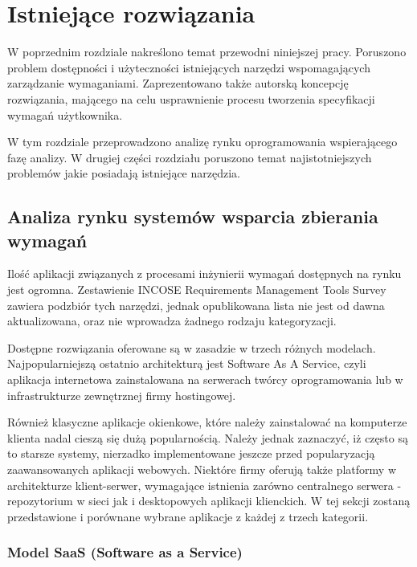 \chapter{Istniejące rozwiązania}

  W poprzednim rozdziale nakreślono temat przewodni niniejszej pracy. Poru\-szono problem dostępności i użyteczności istniejących narzędzi wspomagających zarządzanie wymaganiami. Zaprezentowano także autorską koncepcję rozwiązania, mającego na celu usprawnienie procesu tworzenia specyfikacji wymagań użytkownika. 
  
  W tym rozdziale przeprowadzono analizę rynku oprogramowania wspierającego fazę analizy. W drugiej części rozdziału poruszono temat najistotniejszych problemów jakie posiadają istniejące narzędzia. 

  \section{Analiza rynku systemów wsparcia zbierania wymagań}

    Ilość aplikacji związanych z procesami inżynierii wymagań dostępnych na rynku jest ogromna. Zestawienie INCOSE Requirements Management Tools Survey \cite{Incose} zawiera podzbiór tych narzędzi, jednak opublikowana lista nie jest od dawna aktualizowana, oraz nie wprowadza żadnego rodzaju kategoryzacji. 

    Dostępne rozwiązania oferowane są w zasadzie w trzech różnych modelach. Najpopularniejszą ostatnio architekturą jest Software As A Service, czyli aplikacja internetowa zainstalowana na serwerach twórcy oprogramowania lub w infrastrukturze zewnętrznej firmy hostingowej. 
    
    Również klasyczne aplikacje okienkowe, które należy zainstalować na komputerze klienta nadal cieszą się dużą popularnością. Należy jednak zaznaczyć, iż często są to starsze systemy, nierzadko implementowane jeszcze przed popularyzacją zaawansowanych aplikacji webowych. Niektóre firmy oferują także platformy w architekturze klient-serwer, wymagające istnienia zarówno centralnego serwera - repozytorium w sieci jak i desktopowych aplikacji klienckich. W tej sekcji zostaną przedstawione i porównane wybrane aplikacje z każdej z trzech kategorii. 

    \subsection{Model SaaS (Software as a Service)}

